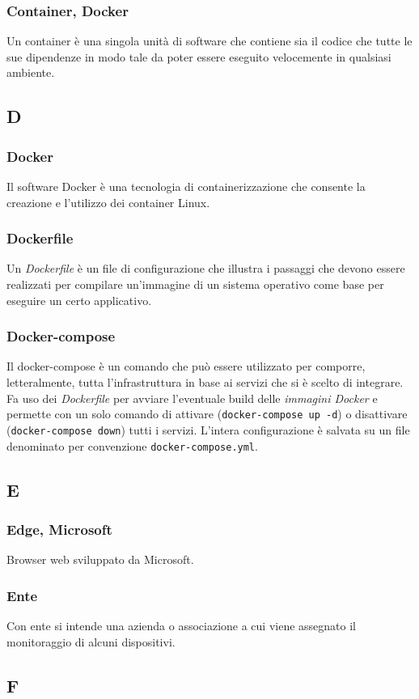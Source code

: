 \subsubsection{Container, Docker}
Un container è una singola unità di software che contiene sia il codice che tutte le sue dipendenze in modo tale da poter essere eseguito velocemente in qualsiasi ambiente.
\subsection{D}
\subsubsection{Docker}  Il software Docker è una tecnologia di containerizzazione che consente la creazione e l'utilizzo dei container Linux.
\subsubsection{Dockerfile}  Un \textit{Dockerfile} è un file di configurazione che illustra i passaggi che devono essere realizzati per compilare un'immagine di un sistema operativo come base per eseguire un certo applicativo.
\subsubsection{Docker-compose}  Il docker-compose è un comando che può essere utilizzato per comporre, letteralmente, tutta l'infrastruttura in base ai servizi che si è scelto di integrare. Fa uso dei \textit{Dockerfile} per avviare l'eventuale build delle \textit{immagini Docker} e permette con un solo comando di attivare (\verb!docker-compose up -d!) o disattivare (\verb!docker-compose down!) tutti i servizi. L'intera configurazione è salvata su un file denominato per convenzione \verb!docker-compose.yml!.
\subsection{E}
\subsubsection{Edge, Microsoft}
Browser web sviluppato da Microsoft.
\subsubsection{Ente}
Con ente si intende una azienda o associazione a cui viene assegnato il monitoraggio di alcuni dispositivi.
\subsection{F}
